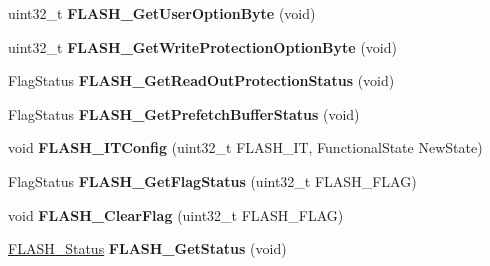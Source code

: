 \begin{DoxyCompactItemize}
\item 
\hypertarget{group__FLASH__Exported__Functions_ga31441647fac5fbb38369613076737943}{
uint32\_\-t {\bfseries FLASH\_\-GetUserOptionByte} (void)}
\label{group__FLASH__Exported__Functions_ga31441647fac5fbb38369613076737943}

\item 
\hypertarget{group__FLASH__Exported__Functions_gac009e061562c7d36d7d2d00bb1c8aafa}{
uint32\_\-t {\bfseries FLASH\_\-GetWriteProtectionOptionByte} (void)}
\label{group__FLASH__Exported__Functions_gac009e061562c7d36d7d2d00bb1c8aafa}

\item 
\hypertarget{group__FLASH__Exported__Functions_ga57fe56770ff25b358f3e36bd70632e37}{
FlagStatus {\bfseries FLASH\_\-GetReadOutProtectionStatus} (void)}
\label{group__FLASH__Exported__Functions_ga57fe56770ff25b358f3e36bd70632e37}

\item 
\hypertarget{group__FLASH__Exported__Functions_ga289bffe7f078d6a130222f03c59bc235}{
FlagStatus {\bfseries FLASH\_\-GetPrefetchBufferStatus} (void)}
\label{group__FLASH__Exported__Functions_ga289bffe7f078d6a130222f03c59bc235}

\item 
\hypertarget{group__FLASH__Exported__Functions_ga94c1e51a9c3bf8d48eb6eb4a4d054861}{
void {\bfseries FLASH\_\-ITConfig} (uint32\_\-t FLASH\_\-IT, FunctionalState NewState)}
\label{group__FLASH__Exported__Functions_ga94c1e51a9c3bf8d48eb6eb4a4d054861}

\item 
\hypertarget{group__FLASH__Exported__Functions_gae3fb545e32f21501ca27d4380e0f2088}{
FlagStatus {\bfseries FLASH\_\-GetFlagStatus} (uint32\_\-t FLASH\_\-FLAG)}
\label{group__FLASH__Exported__Functions_gae3fb545e32f21501ca27d4380e0f2088}

\item 
\hypertarget{group__FLASH__Exported__Functions_gac4be1d486483fa5cd70ec77d44ca8f87}{
void {\bfseries FLASH\_\-ClearFlag} (uint32\_\-t FLASH\_\-FLAG)}
\label{group__FLASH__Exported__Functions_gac4be1d486483fa5cd70ec77d44ca8f87}

\item 
\hypertarget{group__FLASH__Exported__Functions_gac265b8d1e7ea11e44ceee28797c3debb}{
\hyperlink{group__FLASH__Exported__Types_gadc63a6f3404ff1f71229a66915e9cdc0}{FLASH\_\-Status} {\bfseries FLASH\_\-GetStatus} (void)}
\label{group__FLASH__Exported__Functions_gac265b8d1e7ea11e44ceee28797c3debb}


\end{DoxyCompactItemize}
